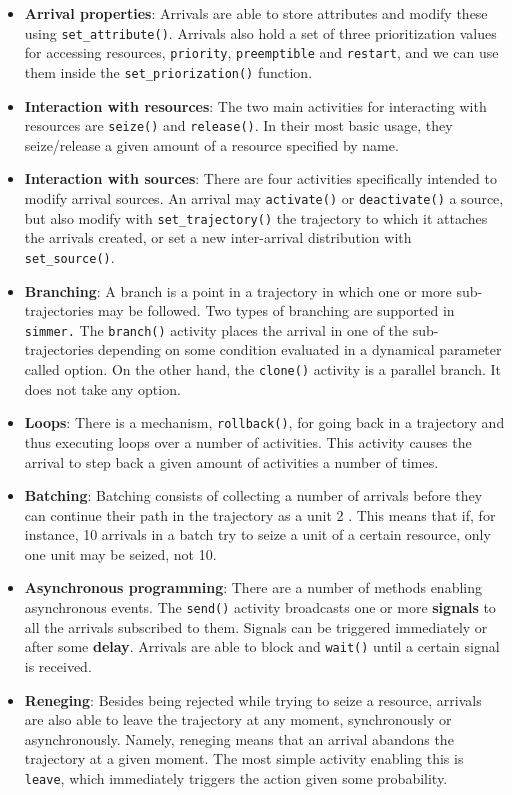\documentclass[
]{book}
\providecommand{\tightlist}{%
  \setlength{\itemsep}{0pt}\setlength{\parskip}{0pt}}
\theoremstyle{definition}
\theoremstyle{definition}
\theoremstyle{definition}
\theoremstyle{definition}
\theoremstyle{remark}
\begin{document}
\begin{itemize}
\tightlist
\item
  \textbf{Arrival properties}: Arrivals are able to store attributes and modify these using \texttt{set\_attribute()}. Arrivals also hold a set of three prioritization values for accessing resources, \texttt{priority}, \texttt{preemptible} and \texttt{restart}, and we can use them inside the \texttt{set\_priorization()} function.
\item
  \textbf{Interaction with resources}: The two main activities for interacting with resources are \texttt{seize()} and \texttt{release()}. In their most basic usage, they seize/release a given amount of a resource specified by name.
\item
  \textbf{Interaction with sources}: There are four activities specifically intended to modify arrival sources. An arrival may \texttt{activate()} or \texttt{deactivate()} a source, but also modify with \texttt{set\_trajectory()} the trajectory to which it attaches the arrivals created, or set a new inter-arrival distribution with \texttt{set\_source()}.
\item
  \textbf{Branching}: A branch is a point in a trajectory in which one or more sub-trajectories may be followed. Two types of branching are supported in \texttt{simmer.} The \texttt{branch()} activity places the arrival in one of the sub-trajectories depending on some condition evaluated in a dynamical parameter called option. On the other hand, the \texttt{clone()} activity is a parallel branch. It does not take any option.
\item
  \textbf{Loops}: There is a mechanism, \texttt{rollback()}, for going back in a trajectory and thus executing loops over a number of activities. This activity causes the arrival to step back a given amount of activities a number of times.
\item
  \textbf{Batching}: Batching consists of collecting a number of arrivals before they can continue their path in the trajectory as a unit 2 . This means that if, for instance, 10 arrivals in a batch try to seize a unit of a certain resource, only one unit may be seized, not 10.
\item
  \textbf{Asynchronous programming}: There are a number of methods enabling asynchronous events. The \texttt{send()} activity broadcasts one or more \textbf{signals} to all the arrivals subscribed to them. Signals can be triggered immediately or after some \textbf{delay}. Arrivals are able to block and \texttt{wait()} until a certain signal is received.
\item
  \textbf{Reneging}: Besides being rejected while trying to seize a resource, arrivals are also able to leave the trajectory at any moment, synchronously or asynchronously. Namely, reneging means that an arrival abandons the trajectory at a given moment. The most simple activity enabling this is \texttt{leave}, which immediately triggers the action given some probability.
\end{itemize}
\end{document}
